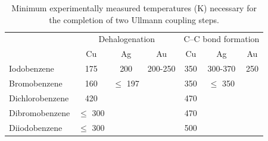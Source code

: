 \documentclass[journal=jpclcd,layout=traditional,manuscript=letter]{achemso} %
\begin{document}
\begin{table}
\centering
\scriptsize
\caption{Minimum experimentally measured temperatures (\si{\kelvin}) necessary for the completion of two Ullmann coupling steps.}
\begin{tabular}{ lcccccc }
 \hline
 \hline
  & \multicolumn{3}{c}{Dehalogenation} & \multicolumn{3}{c}{C--C bond formation} \\
  &\multicolumn{1}{c}{Cu} &\multicolumn{1}{c}{Ag} & \multicolumn{1}{c}{Au} & \multicolumn{1}{c}{Cu} &\multicolumn{1}{c}{Ag} &\multicolumn{1}{c}{Au}\\
 \hline
 Iodobenzene             &175\cite{sur_sci01} &200\cite{sur_sci02} &200-250\cite{sur_sci03} &350\cite{ullmann_68} &300-370\cite{ullmann_68} &250\cite{sur_sci03}\\
 Bromobenzene  &160\cite{ullmann_67} &$\leq$ 197\cite{sur_sci02}  &  &350\cite{ullmann_67}  &$\leq$ 350\cite{sur_sci02}  & \\
 Dichlorobenzene &420\cite{ullmann_52} & & &470\cite{ullmann_52} & & \\
 Dibromobenzene &$\leq$ 300\cite{ullmann_52} & & &470\cite{ullmann_98}  & & \\
 Diiodobenzene &$\leq$ 300\cite{ullmann_52} & & &500 \cite{ullmann_88} & & \\
 \hline
 \hline
\end{tabular}
\label{table:experimental-temperatures}
\end{table}
\end{document}
